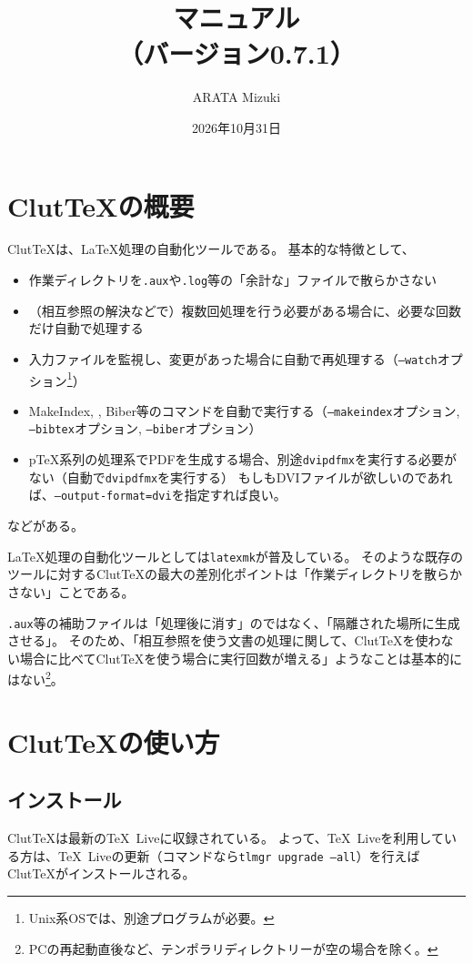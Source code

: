 \documentclass[a4paper]{ltjsreport}
\title{\ClutTeX{}マニュアル\\（バージョン0.7.1）}%
\author{ARATA Mizuki}
\date{2026年10月31日}
\newcommand\ClutTeX{Clut\TeX}
\begin{document}
\maketitle
\tableofcontents

\chapter{\ClutTeX{}の概要}
\ClutTeX{}は、\LaTeX{}処理の自動化ツールである。
基本的な特徴として、
\begin{itemize}
\item 作業ディレクトリを\texttt{.aux}や\texttt{.log}等の「余計な」ファイルで散らかさない
\item （相互参照の解決などで）複数回処理を行う必要がある場合に、必要な回数だけ自動で処理する
\item 入力ファイルを監視し、変更があった場合に自動で再処理する（\texttt{--watch}オプション\footnote{Unix系OSでは、別途プログラムが必要。}）
\item MakeIndex, \BibTeX, Biber等のコマンドを自動で実行する（\texttt{--makeindex}オプション, \texttt{--bibtex}オプション, \texttt{--biber}オプション）
\item p\TeX 系列の処理系でPDFを生成する場合、別途\texttt{dvipdfmx}を実行する必要がない（自動で\texttt{dvipdfmx}を実行する）
  もしもDVIファイルが欲しいのであれば、\texttt{--output-format=dvi}を指定すれば良い。
\end{itemize}
などがある。

\LaTeX{}処理の自動化ツールとしては\texttt{latexmk}が普及している。
そのような既存のツールに対する\ClutTeX{}の最大の差別化ポイントは「作業ディレクトリを散らかさない」ことである。

\texttt{.aux}等の補助ファイルは「処理後に消す」のではなく、「隔離された場所に生成させる」。
そのため、「相互参照を使う文書の処理に関して、\ClutTeX{}を使わない場合に比べて\ClutTeX{}を使う場合に実行回数が増える」ようなことは基本的にはない\footnote{PCの再起動直後など、テンポラリディレクトリーが空の場合を除く。}。

\chapter{\ClutTeX{}の使い方}
\section{インストール}
\ClutTeX{}は最新の\TeX\ Liveに収録されている。
よって、\TeX\ Liveを利用している方は、\TeX\ Liveの更新（コマンドなら\texttt{tlmgr upgrade --all}）を行えば\ClutTeX{}がインストールされる。
\end{document}
